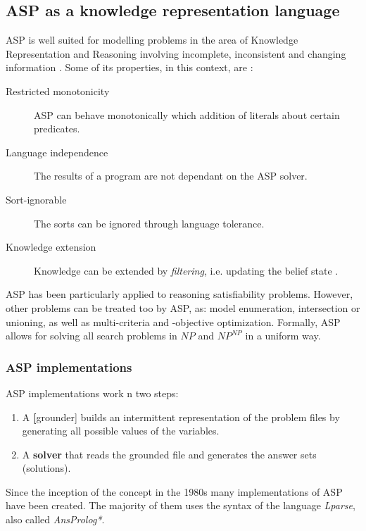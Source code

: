 \subsection{ASP as a knowledge representation language}

ASP is well suited for modelling problems in the area of Knowledge Representation and Reasoning involving incomplete, inconsistent and changing information \citep{Schaub13_ASPBoCo}. Some of its properties, in this context, are \citep{Todorova2006_CKASP}:

\begin{description}
\item[Restricted monotonicity] ASP can behave monotonically which addition of literals about certain predicates.
\item[Language independence] The results of a program are not dependant on the ASP solver.
\item[Sort-ignorable] The sorts can be ignored through language tolerance. %
\item[Knowledge extension] Knowledge can be extended by \textit{filtering}, i.e. updating the belief state \citep{Amir2003_LogFil}.
\end{description}

ASP has been particularly applied to reasoning satisfiability problems.
However, other problems can be treated too by ASP, as: model enumeration, intersection or unioning, as well as multi-criteria and -objective optimization. 
Formally, ASP allows for solving all search problems in $NP$ and $NP^{NP}$ in a uniform way. 


\subsubsection{ASP implementations}
ASP implementations work n two steps:

\begin{enumerate}
\item A \textbf[grounder] builds an intermittent representation of the problem files by generating all possible values of the variables.
\item A \textbf{solver} that reads the grounded file and generates the answer sets (solutions).
\end{enumerate}

Since the inception of the concept in the 1980s \citep{Gelf88a} many implementations of ASP have been created.
The majority of them uses the syntax of the language \textit{Lparse}, also called \textit{AnsProlog*}.

